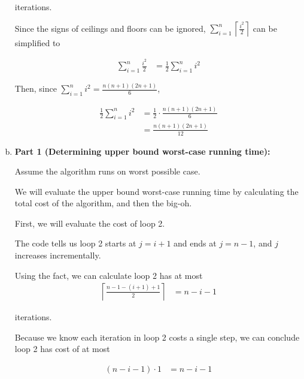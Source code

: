 \documentclass[12pt]{article}
\begin{document}
\begin{enumerate}[a.]
    iterations.

    \bigskip

    Since the signs of ceilings and floors can be ignored, $\sum\limits_{i=1}^{n} \left\lceil \frac{i^2}{2} \right\rceil$
    can be simplified to

    \begin{align}
        \sum\limits_{i=1}^{n} \frac{i^2}{2} &= \frac{1}{2} \sum\limits_{i=1}^{n} i^2
    \end{align}

    \bigskip

    Then, since $\sum\limits_{i=1}^{n} i^2 = \frac{n(n+1)(2n+1)}{6}$,

    \begin{align}
        \frac{1}{2} \sum\limits_{i=1}^{n} i^2 &= \frac{1}{2} \cdot \frac{n(n+1)(2n+1)}{6}\\
        &= \frac{n(n+1)(2n+1)}{12}
    \end{align}

    \item

    \textbf{Part 1 (Determining upper bound worst-case running time):}

    \bigskip

    Assume the algorithm runs on worst possible case.

    \bigskip

    We will evaluate the upper bound worst-case running time by calculating the
    total cost of the algorithm, and then the big-oh.

    \bigskip

    First, we will evaluate the cost of loop 2.

    \bigskip

    The code tells us loop 2 starts at $j = i + 1$ and ends at $j = n - 1$, and
    $j$ increases incrementally.

    \bigskip

    Using the fact, we can calculate loop 2 has at most
    \setcounter{equation}{0}
    \begin{align}
        \left\lceil \frac{n-1-(i+1)+1}{2} \right\rceil &= n - i - 1
    \end{align}

    iterations.

    \bigskip

    Because we know each iteration in loop 2 costs a single step, we can conclude
    loop 2 has cost of at most

    \begin{align}
        (n - i - 1) \cdot 1 &= n - i - 1
    \end{align}


\end{enumerate}
\end{document}
